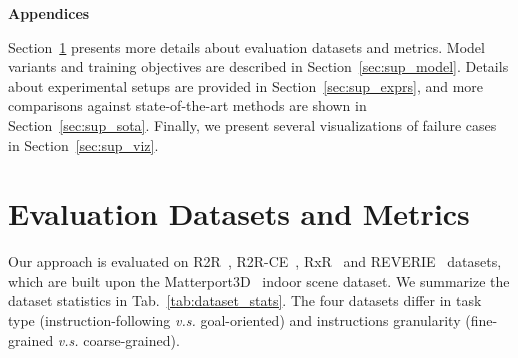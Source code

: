 \appendix
\label{sec:appendix}
{\large
\noindent\textbf{Appendices}
}
\vspace{1mm}

Section~\ref{sec:sup_dataset} presents more details about evaluation datasets and metrics. 
Model variants and training objectives are described in Section~\ref{sec:sup_model}.
Details about experimental setups are provided in Section~\ref{sec:sup_exprs}, and more comparisons against state-of-the-art methods are shown in Section~\ref{sec:sup_sota}.
Finally, we present several visualizations of failure cases in Section~\ref{sec:sup_viz}.



\begin{table*}[h]
\centering
\small
{}
\vspace{-2.5mm}
\caption{Dataset statistics. \#house, \#instr denote the number of houses and instructions respectively.}\label{tab:dataset_stats}
\end{table*}



\section{Evaluation Datasets and  Metrics}\label{sec:sup_dataset}
Our approach is evaluated on R2R~\cite{anderson2018vision}, R2R-CE~\cite{krantz2020beyond}, RxR~\cite{ku2020room} and REVERIE~\cite{qi2020reverie} datasets, which are built upon the Matterport3D~\cite{chang2017matterport3d} indoor scene dataset. 
We summarize the dataset statistics in Tab.~\ref{tab:dataset_stats}. The four datasets differ in task type (instruction-following \textit{v.s.} goal-oriented) and instructions granularity (fine-grained \textit{v.s.} coarse-grained). 


